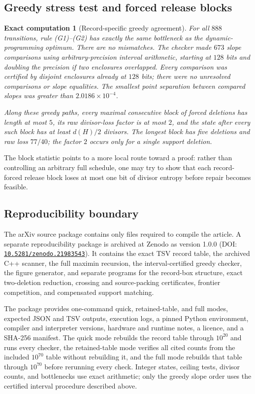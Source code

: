 \documentclass[11pt]{article}
\numberwithin{equation}{section}
\theoremstyle{blueplain}
\theoremstyle{bluedef}
\newtheorem{computation}[theorem]{Exact computation}
\newcommand{\zenododoi}{\href{https://doi.org/10.5281/zenodo.21983543}{\nolinkurl{10.5281/zenodo.21983543}}}
\begin{document}
\subsection{Greedy stress test and forced release blocks}

\begin{computation}[Record-specific greedy agreement]
\label{comp:greedy}
For all $888$ transitions, rule \textup{(G1)--(G2)} has exactly the same bottleneck as the dynamic-programming optimum.  There are no mismatches.  The checker made $673$ slope comparisons using arbitrary-precision interval arithmetic, starting at $128$ bits and doubling the precision if two enclosures overlapped.  Every comparison was certified by disjoint enclosures already at $128$ bits; there were no unresolved comparisons or slope equalities.  The smallest point separation between compared slopes was greater than $2.0186\times10^{-4}$.

Along these greedy paths, every maximal consecutive block of forced deletions has length at most $5$, its raw divisor-loss factor is at most $2$, and the state after every such block has at least $d(H)/2$ divisors.  The longest block has five deletions and raw loss $77/40$; the factor $2$ occurs only for a single support deletion.
\end{computation}

The block statistic points to a more local route toward a proof: rather than controlling an arbitrary full schedule, one may try to show that each record-forced release block loses at most one bit of divisor entropy before repair becomes feasible.

\subsection{Reproducibility boundary}

 The arXiv source package contains only files required to compile the article.  A separate reproducibility package is archived at Zenodo as version 1.0.0 (DOI: \zenododoi).  It contains the exact TSV record table, the archived C++ scanner, the full maximin recursion, the interval-certified greedy checker, the figure generator, and separate programs for the record-box structure, exact two-deletion reduction, crossing and source-packing certificates, frontier competition, and compensated support matching.

 The package provides one-command quick, retained-table, and full modes, expected JSON and TSV outputs, execution logs, a pinned Python environment, compiler and interpreter versions, hardware and runtime notes, a licence, and a SHA-256 manifest.  The quick mode rebuilds the record table through $10^{20}$ and runs every checker, the retained-table mode verifies all cited counts from the included $10^{70}$ table without rebuilding it, and the full mode rebuilds that table through $10^{70}$ before rerunning every check.  Integer states, ceiling tests, divisor counts, and bottlenecks use exact arithmetic; only the greedy slope order uses the certified interval procedure described above.
\end{document}
